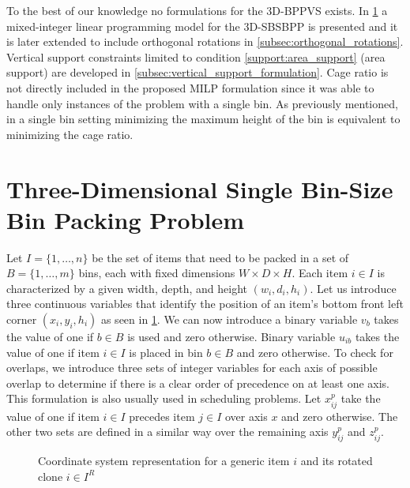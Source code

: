 To the best of our knowledge no formulations for the 3D-BPPVS exists.
In \cref{sec:milp} a mixed-integer linear programming model for the 3D-SBSBPP is presented and it is later extended to include orthogonal rotations in \cref{subsec:orthogonal_rotations}.
Vertical support constraints limited to condition \ref{support:area_support} (area support) are developed in \cref{subsec:vertical_support_formulation}.
Cage ratio is not directly included in the proposed MILP formulation since it was able to handle only instances of the problem with a single bin.
As previously mentioned, in a single bin setting minimizing the maximum height of the bin is equivalent to minimizing the cage ratio.

\section{Three-Dimensional Single Bin-Size Bin Packing Problem}
\label{sec:milp}%
Let $I = \{1,\dots, n \}$ be the set of items that need to be packed in a set of $B = \{1,\dots, m \}$ bins, each with fixed dimensions $W \times D \times H$.
Each item $i \in I$ is characterized by a given width, depth, and height $(w_i, d_i, h_i)$.
Let us introduce three continuous variables that identify the position of an item's bottom front left corner $(x_i, y_i, h_i)$ as seen in \cref{fig:coordinate_system}.
We can now introduce a binary variable $v_{b}$ takes the value of one if $b \in B$ is used and zero otherwise. Binary variable $u_{ib}$ takes the value of one if item $i \in I$ is placed in bin $b \in B$ and zero otherwise.
To check for overlaps, we introduce three sets of integer variables for each axis of possible overlap to determine if there is a clear order of precedence on at least one axis. This formulation is also usually used in scheduling problems.
Let $x^p_{ij}$ take the value of one if item $i \in I$ precedes item $j \in I$ over axis $x$ and zero otherwise.
The other two sets are defined in a similar way over the remaining axis $y^p_{ij}$ and $z^p_{ij}$.

\begin{figure}
    \scalebox{0.62}{%
    
    }
    \caption{Coordinate system representation for a generic item $i$ and its rotated clone $i \in I^R$}
    \label{fig:coordinate_system}
\end{figure}

